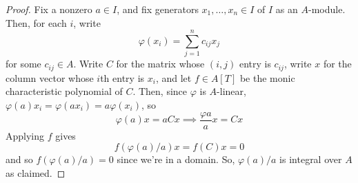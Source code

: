 \begin{proof}
	Fix a nonzero $a \in I$, and fix generators $x_1,\ldots,x_n \in I$ of $I$ as an $A$-module. Then, for each $i$, write
	\[ \varphi(x_i) = \sum_{j=1}^n c_{ij}x_j \]
	for some $c_{ij} \in A$. Write $C$ for the matrix whose $(i,j)$ entry is $c_{ij}$, write $x$ for the column vector whose $i$th entry is $x_i$, and let $f \in A[T]$ be the monic characteristic polynomial of $C$. Then, since $\varphi$ is $A$-linear, $\varphi(a)x_i = \varphi(ax_i) = a\varphi(x_i)$, so
	\[ \varphi(a)x = aCx \implies \frac{\varphi{a}}{a}x = Cx \]
	Applying $f$ gives
	\[ f(\varphi(a)/a)x = f(C)x = 0 \]
	and so $f(\varphi(a)/a) = 0$ since we're in a domain. So, $\varphi(a)/a$ is integral over $A$ as claimed.
\end{proof}
